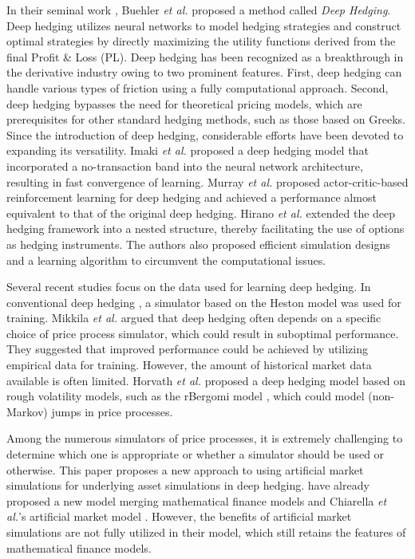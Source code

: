 In their seminal work \cite{deep-hedging,Buehler2019b}, Buehler {\it et al.} proposed a method called \emph{Deep Hedging}.
Deep hedging utilizes neural networks to model hedging strategies and construct optimal strategies by directly maximizing the utility functions derived from the final Profit \& Loss (PL).
Deep hedging has been recognized as a breakthrough in the derivative industry owing to two prominent features.
First, deep hedging can handle various types of friction using a fully computational approach.
Second, deep hedging bypasses the need for theoretical pricing models, which are prerequisites for other standard hedging methods, such as those based on Greeks.
Since the introduction of deep hedging, considerable efforts have been devoted to expanding its versatility.
Imaki {\it et al.} \cite{Imaki2023} proposed a deep hedging model that incorporated a no-transaction band \cite{Davis1993} into the neural network architecture, resulting in fast convergence of learning.
Murray {\it et al.} \cite{Murray2022-nz, Buehler2022-nr} proposed actor-critic-based reinforcement learning for deep hedging and achieved a performance almost equivalent to that of the original deep hedging.
Hirano {\it et al.} \cite{Hirano2023-iiaiaai-ndh} extended the deep hedging framework into a nested structure, thereby facilitating the use of options as hedging instruments. The authors also proposed efficient simulation designs and a learning algorithm to circumvent the computational issues.

Several recent studies focus on the data used for learning deep hedging.
In conventional deep hedging \cite{deep-hedging}, a simulator based on the Heston model \cite{Heston1993} was used for training.
Mikkila {\it et al.} \cite{Mikkila2023-gk} argued that deep hedging often depends on a specific choice of price process simulator, which could result in suboptimal performance. They suggested that improved performance could be achieved by utilizing empirical data for training. However, the amount of historical market data available is often limited.
Horvath {\it et al.} \cite{Horvath2021} proposed a deep hedging model based on rough volatility models, such as the rBergomi model \cite{Bayer2015}, which could model (non-Markov) jumps in price processes.

Among the numerous simulators of price processes, it is extremely challenging to determine which one is appropriate or whether a simulator should be used or otherwise.
This paper proposes a new approach to using artificial market simulations for underlying asset simulations in deep hedging.
\cite{Gao2023} have already proposed a new model merging mathematical finance models and Chiarella {\it et al.}'s artificial market model \cite{CI2002}.
However, the benefits of artificial market simulations are not fully utilized in their model, which still retains the features of mathematical finance models.

